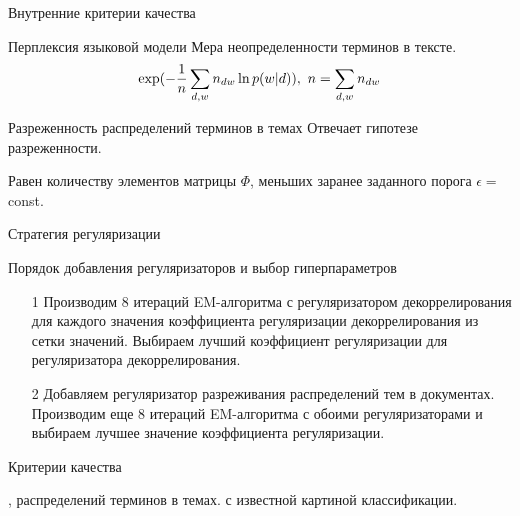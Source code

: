 \documentclass{beamer}
\begin{document}
\begin{frame}{Внутренние критерии качества}
\begin{block}{Перплексия языковой модели}
	Мера неопределенности терминов в тексте.
\begin{align*}
 \exp(-{1\over{n}}\sum\limits_{d,w} {n_{dw}}\ln p(w|d)),~n=\sum\limits_{d,w}{n_{dw}}
\end{align*} 
    \end{block}
\begin{block}{Разреженность распределений терминов в темах}
	Отвечает гипотезе разреженности. 
	
Равен количеству элементов матрицы $\Phi$, меньших заранее заданного порога $\epsilon=$ const.
    \end{block}
\end{frame}
\begin{frame}{Стратегия регуляризации}
\begin{block}{Порядок добавления регуляризаторов и выбор гиперпараметров}
    \begin{itemize}
        \item[1] Производим 8 итераций EM-алгоритма с регуляризатором декоррелирования для каждого значения коэффициента регуляризации декоррелирования из сетки значений. Выбираем лучший коэффициент регуляризации для регуляризатора декоррелирования.
        \item[2] Добавляем регуляризатор разреживания распределений тем в документах. Производим еще 8 итераций EM-алгоритма с обоими регуляризаторами и выбираем лучшее значение коэффициента регуляризации.
    \end{itemize} 
    \end{block}
\begin{block}{Критерии качества}
\begin{itemize}
 , 
 распределений терминов в темах.
 с известной картиной классификации.
    \end{itemize} 
\end{block}
\end{frame}
\end{document}
